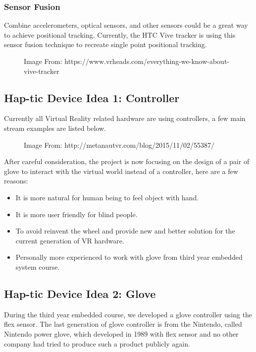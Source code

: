 \documentclass[12pt,a4paper]{report}
\begin{document}
\subsubsection{Sensor Fusion }

Combine accelerometers, optical sensors, and other sensors could be a great way to achieve positional tracking. Currently, the HTC Vive tracker is using this sensor fusion technique to recreate single point positional tracking.  

\begin{figure}[H]
    \centering
	\caption{Image From: https://www.vrheads.com/everything-we-know-about-vive-tracker}
	\label{fig:full}
\end{figure}
\subsection{Hap-tic Device Idea 1: Controller}

Currently all Virtual Reality related hardware are using controllers, a few main stream examples are listed below.
\begin{figure}[H]
    \centering
	\caption{Image From: http://metanautvr.com/blog/2015/11/02/55387/}
	\label{fig:full}
\end{figure}
After careful consideration, the project is now focusing on the design of a pair of glove to interact with the virtual world instead of a controller, here are a few reasons: 

\begin{itemize}
  \item It is more natural for human being to feel object with hand. 
  \item It is more user friendly for blind people. 
  \item To avoid reinvent the wheel and provide new and better solution for the current generation of VR hardware. 
  \item Personally more experienced to work with glove from third year embedded system course. 
\end{itemize}

\subsection{Hap-tic Device Idea 2: Glove}

During the third year embedded course, we developed a glove controller using the flex sensor. The last generation of glove controller is from the Nintendo, called Nintendo power glove, which developed in 1989 with flex sensor and no other company had tried to produce such a product publicly again.  
\end{document}
